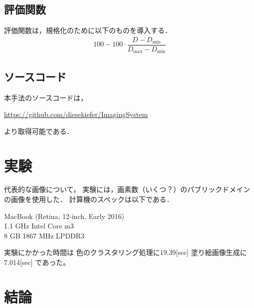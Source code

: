 \documentclass[dvipdfmx]{jsarticle}
\begin{document}
\subsection{評価関数}
評価関数は，規格化のために以下のものを導入する．
\begin{align}
100-100\cdot\dfrac{D-D_{\mathrm{min}}}{D_{\mathrm{max}}-D_{\mathrm{min}}}
\end{align}



\subsection{ソースコード}

本手法のソースコードは，

\noindent\url{https://github.com/diesekiefer/ImagingSystem}

\noindent より取得可能である．


\section{実験}
代表的な画像について，
実験には，画素数（いくつ？）のパブリックドメインの画像を使用した．
計算機のスペックは以下である．
\begin{screen}
MacBook (Retina, 12-inch, Early 2016)\\
1.1 GHz Intel Core m3\\
8 GB 1867 MHz LPDDR3
\end{screen}
実験にかかった時間は
色のクラスタリング処理に19.39[sec]
塗り絵画像生成に7.014[sec]
であった。

\section{結論}
\end{document}
